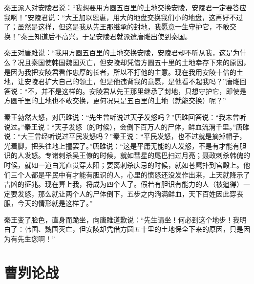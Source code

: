 \documentclass[12pt,UTF-8,openany]{ctexbook}
\begin{document}
\begin{normalsize}
    
    秦王派人对安陵君说：“我想要用方圆五百里的土地交换安陵，安陵君一定要答应我啊！”安陵君说：“大王加以恩惠，用大的地盘交换我们小的地盘，这再好不过了；虽然是这样，但这是我从先王那继承的封地，我愿意一生守护它，不敢交换！”秦王知道后不高兴。于是安陵君就派遣唐雎出使到秦国。
    
    秦王对唐雎说：“我用方圆五百里的土地交换安陵，安陵君却不听从我，这是为什么？况且秦国使韩国魏国灭亡，但安陵却凭借方圆五十里的土地幸存下来的原因，是因为我把安陵君看作忠厚的长者，所以不打他的主意。现在我用安陵十倍的土地，让安陵君扩大自己的领土，但是他违背我的意愿，是他看不起我吗？”唐雎回答说：“不，并不是这样的。安陵君从先王那里继承了封地，只想守护它，即使是方圆千里的土地也不敢交换，更何况只是五百里的土地（就能交换）呢？”
    
    秦王勃然大怒，对唐雎说：“先生曾听说过天子发怒吗？”唐雎回答说：“我未曾听说过。”秦王说：“天子发怒（的时候），会倒下百万人的尸体，鲜血流淌千里。”唐雎说：“大王曾经听说过平民发怒吗？”秦王说：“平民发怒，也不过就是摘掉帽子，光着脚，把头往地上撞罢了。”唐雎说：“这是平庸无能的人发怒，不是有才能有胆识的人发怒。专诸刺杀吴王僚的时候，就如彗星的尾巴扫过月亮；聂政刺杀韩傀的时候，就如一道白光直贯穿太阳；要离刺杀庆忌的时候，就如苍鹰扑到宫殿上。他们三个人都是平民中有才能有胆识的人，心里的愤怒还没发作出来，上天就降示了吉凶的征兆。现在算上我，将成为四个人了。假若有胆识有能力的人（被逼得）一定要发怒，那么就让两个人的尸体倒下，五步之内淌满鲜血，天下百姓因此穿丧服，今天的情形就是这样了。”
    
    秦王变了脸色，直身而跪坐，向唐雎道歉说：“先生请坐！何必到这个地步！我明白了：韩国、魏国灭亡，但安陵却凭借方圆五十里的土地保全下来的原因，只是因为有先生您啊！”
    
\end{normalsize}



\chapter{曹刿论战}
\end{document}
